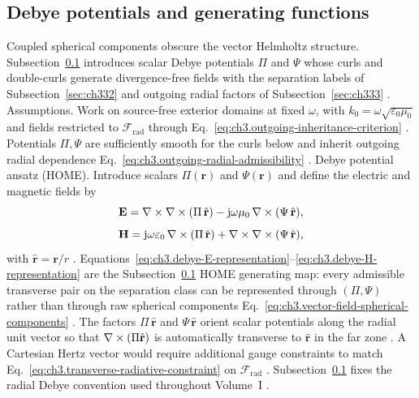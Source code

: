 \subsection{Debye potentials and generating functions}
\label{sec:ch334}
Coupled spherical components obscure the vector Helmholtz structure. Subsection~\ref{sec:ch334} introduces
scalar Debye potentials \(\Pi\) and \(\Psi\) whose curls and double-curls generate divergence-free fields with
the separation labels of Subsection~\ref{sec:ch332} and outgoing radial factors of Subsection~\ref{sec:ch333}
\cite{stratton1941}.
Assumptions. Work on source-free exterior domains at fixed \(\omega\), with \(k_{0}=\omega\sqrt{\varepsilon_{0}\mu_{0}}\) and
fields restricted to \(\mathcal{F}_{\mathrm{rad}}\) through Eq.~\eqref{eq:ch3.outgoing-inheritance-criterion}
\cite{stratton1941}. Potentials \(\Pi,\Psi\) are sufficiently smooth for the curls below and
inherit outgoing radial dependence Eq.~\eqref{eq:ch3.outgoing-radial-admissibility} \cite{hansen1988}.
Debye potential ansatz (HOME). Introduce scalars \(\Pi(\mathbf{r})\) and \(\Psi(\mathbf{r})\) and define the electric and magnetic fields by
\begin{equation}
\label{eq:ch3.debye-E-representation}
\mathbf{E}
=
\nabla\times\nabla\times(\Pi\,\hat{\mathbf{r}})
-\mathrm{j}\omega\mu_{0}\,\nabla\times(\Psi\,\hat{\mathbf{r}}),
\end{equation}
\begin{equation}
\label{eq:ch3.debye-H-representation}
\mathbf{H}
=
\mathrm{j}\omega\varepsilon_{0}\,\nabla\times(\Pi\,\hat{\mathbf{r}})
+\nabla\times\nabla\times(\Psi\,\hat{\mathbf{r}}),
\end{equation}
with \(\hat{\mathbf{r}}=\mathbf{r}/r\) \cite{stratton1941}. Equations~\eqref{eq:ch3.debye-E-representation}--\eqref{eq:ch3.debye-H-representation}
are the Subsection~\ref{sec:ch334} HOME generating map: every admissible transverse pair on the separation
class can be represented through \((\Pi,\Psi)\) rather than through raw spherical components
Eq.~\eqref{eq:ch3.vector-field-spherical-components} \cite{hansen1988}.
The factors \(\Pi\,\hat{\mathbf{r}}\) and \(\Psi\,\hat{\mathbf{r}}\) orient scalar potentials along the radial
unit vector so that \(\nabla\times(\Pi\hat{\mathbf{r}})\) is automatically transverse to \(\hat{\mathbf{r}}\) in the
far zone \cite{stratton1941}. A Cartesian Hertz vector would require additional gauge constraints to
match Eq.~\eqref{eq:ch3.transverse-radiative-constraint} on \(\mathcal{F}_{\mathrm{rad}}\) \cite{hansen1988}.
Subsection~\ref{sec:ch334} fixes the radial Debye convention used throughout Volume~I \cite{tai1994}.
